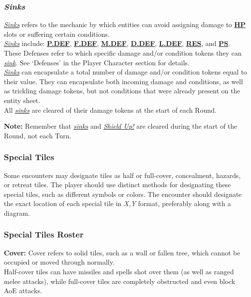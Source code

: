 \documentclass[12pt]{article}
\newcommand{\refto}[1]{\hyperlink{#1}{\textbf{#1}}}
\newcommand{\reftoit}[1]{\hyperlink{#1}{\emph{#1}}}
\begin{document}
\begin{multicols*}{2}
\subsubsection{\emph{Sinks}}
\hypertarget{sink}{}\hypertarget{sunk}{}\hypertarget{sinks}{}\hypertarget{Sinks}{}
\reftoit{Sinks} refers to the mechanic by which entities can avoid assigning damage to \refto{HP} slots or suffering certain conditions.\\
\reftoit{Sinks} include: \refto{P.DEF}, \refto{F.DEF}, \refto{M.DEF}, \refto{D.DEF}, \refto{L.DEF}, \refto{RES}, and \refto{PS}. These Defenses refer to which specific damage and/or condition tokens they can \reftoit{sink}. See ‘Defenses’ in the Player Character section for details.\\
\reftoit{Sinks} can encapsulate a total number of damage and/or condition tokens equal to their value. They can encapsulate both incoming damage and conditions, as well as trickling damage tokens, but not conditions that were already present on the entity sheet.\\
All \reftoit{sinks} are cleared of their damage tokens at the start of each Round.

\begin{tcolorbox}
\textbf{Note:} Remember that \reftoit{sinks} and \reftoit{Shield Up!} are cleared during the start of the Round, not each Turn.
\end{tcolorbox}

\subsubsection{Special Tiles}
Some encounters may designate tiles as half or full-cover, concealment, hazards, or retreat tiles. The player should use distinct methods for designating these special tiles, such as different symbols or colors. The encounter should designate the exact location of each special tile in \emph{X,Y} format, preferably along with a diagram.

\subsubsection{Special Tiles Roster}
\textbf{Cover:} Cover refers to solid tiles, such as a wall or fallen tree, which cannot be occupied or moved through normally.\\
Half-cover tiles can have missiles and spells shot over them (as well as ranged melee attacks), while full-cover tiles are completely obstructed and even block AoE attacks.\\


\end{multicols*}
\end{document}
